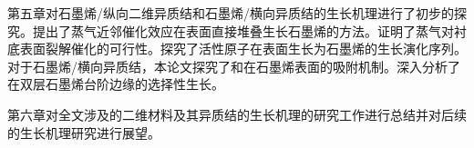     第五章对石墨烯/纵向二维异质结和石墨烯/横向异质结的生长机理进行了初步的探究。提出了蒸气近邻催化效应在表面直接堆叠生长石墨烯的方法。证明了蒸气对衬底表面裂解催化的可行性。探究了活性原子在表面生长为石墨烯的生长演化序列。对于石墨烯/横向异质结，本论文探究了和在石墨烯表面的吸附机制。深入分析了在双层石墨烯台阶边缘的选择性生长。

    第六章对全文涉及的二维材料及其异质结的生长机理的研究工作进行总结并对后续的生长机理研究进行展望。
